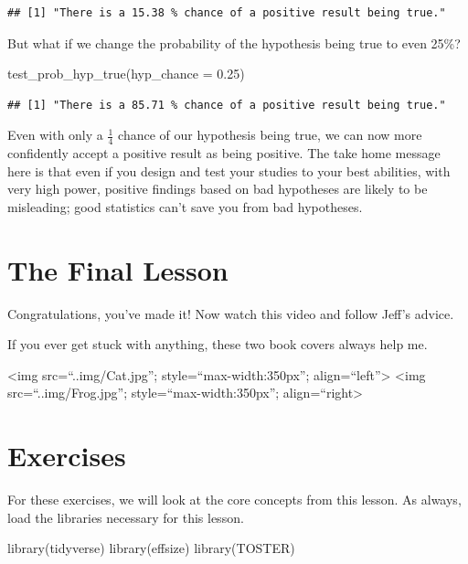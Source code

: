 \documentclass[
]{book}
\newenvironment{Shaded}{\begin{snugshade}}{\end{snugshade}}
\newcommand{\AttributeTok}[1]{\textcolor[rgb]{0.77,0.63,0.00}{#1}}
\newcommand{\FloatTok}[1]{\textcolor[rgb]{0.00,0.00,0.81}{#1}}
\newcommand{\FunctionTok}[1]{\textcolor[rgb]{0.00,0.00,0.00}{#1}}
\newcommand{\NormalTok}[1]{#1}
\begin{document}
\begin{verbatim}
## [1] "There is a 15.38 % chance of a positive result being true."
\end{verbatim}

But what if we change the probability of the hypothesis being true to even 25\%?

\begin{Shaded}
\begin{Highlighting}[]
\FunctionTok{test\_prob\_hyp\_true}\NormalTok{(}\AttributeTok{hyp\_chance =} \FloatTok{0.25}\NormalTok{)}
\end{Highlighting}
\end{Shaded}

\begin{verbatim}
## [1] "There is a 85.71 % chance of a positive result being true."
\end{verbatim}

Even with only a \(\frac{1}{4}\) chance of our hypothesis being true, we can now more confidently accept a positive result as being positive. The take home message here is that even if you design and test your studies to your best abilities, with very high power, positive findings based on bad hypotheses are likely to be misleading; good statistics can't save you from bad hypotheses.

\hypertarget{the-final-lesson}{%
\section{The Final Lesson}\label{the-final-lesson}}

Congratulations, you've made it! Now watch this video and follow Jeff's advice.

If you ever get stuck with anything, these two book covers always help me.

\textless img src=``..img/Cat.jpg''; style=``max-width:350px''; align=``left''\textgreater{}
\textless img src=``..img/Frog.jpg''; style=``max-width:350px''; align=``right\textgreater{}

\hypertarget{exercises-9}{%
\section{Exercises}\label{exercises-9}}

For these exercises, we will look at the core concepts from this lesson. As always, load the libraries necessary for this lesson.

\begin{Shaded}
\begin{Highlighting}[]
\FunctionTok{library}\NormalTok{(tidyverse)}
\FunctionTok{library}\NormalTok{(effsize)}
\FunctionTok{library}\NormalTok{(TOSTER)}
\end{Highlighting}
\end{Shaded}
\end{document}
